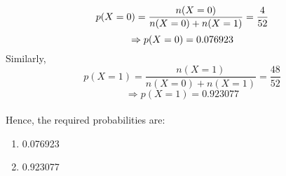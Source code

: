 \documentclass[journal,12pt,twocolumn]{IEEEtran}
\begin{document}
\begin{equation}
    p(X=0) = \frac{n(X = 0)}{n(X = 0) + n(X = 1)} = \frac{4}{52}\\
\end{equation}
\begin{equation}
    \Rightarrow p(X=0) = 0.076923\\
\end{equation}
Similarly,\\
\begin{equation}
    p(X = 1) = \frac{n(X=1)}{n(X=0)+n(X=1)} = \frac{48}{52}
\end{equation}
\begin{equation}
    \Rightarrow p(X=1) = 0.923077
\end{equation}
\\Hence, the required probabilities are:
\begin{enumerate}[label=(\roman*)]
    \item 0.076923
    \item 0.923077
\end{enumerate}
\end{document}
